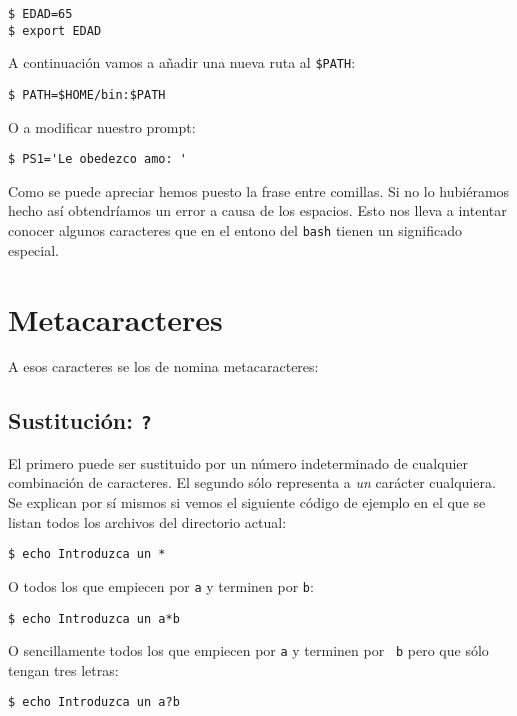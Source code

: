 \begin{verbatim}
$ EDAD=65
$ export EDAD
\end{verbatim}

A continuación vamos a añadir una nueva ruta al {\tt \$PATH}:

\begin{verbatim}
$ PATH=$HOME/bin:$PATH
\end{verbatim}

O a modificar nuestro prompt:

\begin{verbatim}
$ PS1='Le obedezco amo: '
\end{verbatim}

Como se puede apreciar hemos puesto  la frase entre comillas. Si no lo
hubiéramos hecho  así obtendríamos un  error a causa de  los espacios.
Esto nos lleva a intentar conocer  algunos caracteres que en el entono
del {\tt bash} tienen un significado especial.


\section{Metacaracteres}

A esos caracteres se los de nomina metacaracteres:

\subsection{Sustitución: {\tt * ?}}

El  primero  puede  ser  sustituido por  un  número  indeterminado  de
cualquier combinación de caracteres. El segundo sólo representa a {\em
un}  carácter  cualquiera. Se  explican  por  sí  mismos si  vemos  el
siguiente código de ejemplo en el que se listan todos los archivos del
directorio actual:

\begin{verbatim}
$ echo Introduzca un *
\end{verbatim}

O todos los que empiecen por {\tt a} y terminen por {\tt b}:

\begin{verbatim}
$ echo Introduzca un a*b
\end{verbatim}

O sencillamente todos los que empiecen por {\tt a} y terminen por {\tt
b} pero que sólo tengan tres letras:

\begin{verbatim}
$ echo Introduzca un a?b
\end{verbatim}
        

